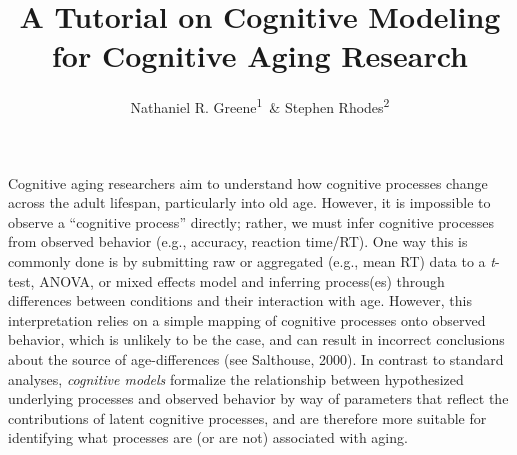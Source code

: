 \documentclass[
  english,
  ,man,floatsintext]{apa6}
\author{Nathaniel R. Greene\textsuperscript{1}\ \& Stephen Rhodes\textsuperscript{2}}
\affiliation{
\vspace{0.5cm}
\textsuperscript{1} Department of Psychological Sciences, University of Missouri\\\textsuperscript{2} Rotman Research Institute, Baycrest Health Sciences, Toronto ON, Canada}
\title{A Tutorial on Cognitive Modeling for Cognitive Aging Research}
\date{}
\begin{document}
\maketitle

Cognitive aging researchers aim to understand how cognitive processes change across the adult lifespan, particularly into old age. However, it is impossible to observe a \enquote{cognitive process} directly; rather, we must infer cognitive processes from observed behavior (e.g., accuracy, reaction time/RT). One way this is commonly done is by submitting raw or aggregated (e.g., mean RT) data to a \emph{t}-test, ANOVA, or mixed effects model and inferring process(es) through differences between conditions and their interaction with age. However, this interpretation relies on a simple mapping of cognitive processes onto observed behavior, which is unlikely to be the case, and can result in incorrect conclusions about the source of age-differences (see Salthouse, 2000). In contrast to standard analyses, \emph{cognitive models} formalize the relationship between hypothesized underlying processes and observed behavior by way of parameters that reflect the contributions of latent cognitive processes, and are therefore more suitable for identifying what processes are (or are not) associated with aging.
\end{document}
